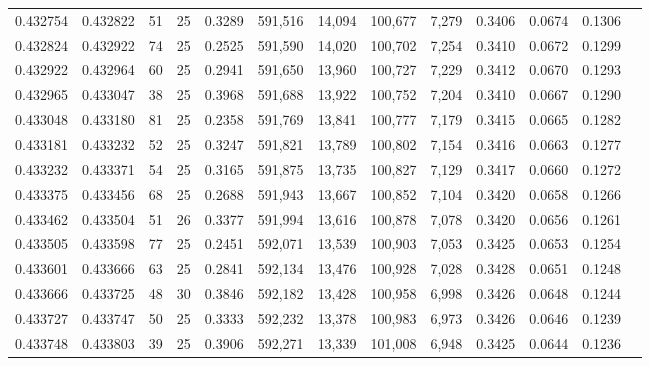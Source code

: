 \begin{tabular}{rrrrrrrrrrrrr}
0.432754 & 0.432822 &    51 &  25 &                                     0.3289 & 591,516 &  14,094 & 100,677 &   7,279 & 0.3406 & 0.0674 & 0.1306 \\
0.432824 & 0.432922 &    74 &  25 &                                     0.2525 & 591,590 &  14,020 & 100,702 &   7,254 & 0.3410 & 0.0672 & 0.1299 \\
0.432922 & 0.432964 &    60 &  25 &                                     0.2941 & 591,650 &  13,960 & 100,727 &   7,229 & 0.3412 & 0.0670 & 0.1293 \\
0.432965 & 0.433047 &    38 &  25 &                                     0.3968 & 591,688 &  13,922 & 100,752 &   7,204 & 0.3410 & 0.0667 & 0.1290 \\
0.433048 & 0.433180 &    81 &  25 &                                     0.2358 & 591,769 &  13,841 & 100,777 &   7,179 & 0.3415 & 0.0665 & 0.1282 \\
0.433181 & 0.433232 &    52 &  25 &                                     0.3247 & 591,821 &  13,789 & 100,802 &   7,154 & 0.3416 & 0.0663 & 0.1277 \\
0.433232 & 0.433371 &    54 &  25 &                                     0.3165 & 591,875 &  13,735 & 100,827 &   7,129 & 0.3417 & 0.0660 & 0.1272 \\
0.433375 & 0.433456 &    68 &  25 &                                     0.2688 & 591,943 &  13,667 & 100,852 &   7,104 & 0.3420 & 0.0658 & 0.1266 \\
0.433462 & 0.433504 &    51 &  26 &                                     0.3377 & 591,994 &  13,616 & 100,878 &   7,078 & 0.3420 & 0.0656 & 0.1261 \\
0.433505 & 0.433598 &    77 &  25 &                                     0.2451 & 592,071 &  13,539 & 100,903 &   7,053 & 0.3425 & 0.0653 & 0.1254 \\
0.433601 & 0.433666 &    63 &  25 &                                     0.2841 & 592,134 &  13,476 & 100,928 &   7,028 & 0.3428 & 0.0651 & 0.1248 \\
0.433666 & 0.433725 &    48 &  30 &                                     0.3846 & 592,182 &  13,428 & 100,958 &   6,998 & 0.3426 & 0.0648 & 0.1244 \\
0.433727 & 0.433747 &    50 &  25 &                                     0.3333 & 592,232 &  13,378 & 100,983 &   6,973 & 0.3426 & 0.0646 & 0.1239 \\
0.433748 & 0.433803 &    39 &  25 &                                     0.3906 & 592,271 &  13,339 & 101,008 &   6,948 & 0.3425 & 0.0644 & 0.1236 \\

\end{tabular}
